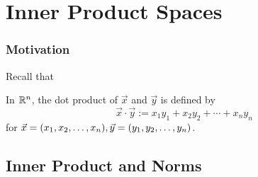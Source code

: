 \section{Inner Product Spaces}
\subsubsection*{Motivation}
Recall that 
\begin{definition}
    In $\mathbb R^n$, the dot product of $\vec x$ and $\vec y$ is defined by  
\[ \vec x \cdot \vec y := x_1y_1 + x_2y_2 + \cdots + x_ny_n\]
for $\vec x = ({x}_1,{x}_2, \ldots, {x}_{n}), \vec y = ({y}_1,{y}_2, \ldots, {y}_{n})$.
\end{definition}
\subsection{Inner Product and Norms}
